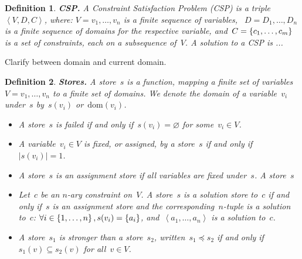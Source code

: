 \documentclass[a4paper,11pt]{article}
\newtheorem{definition}{Definition}
\newcommand{\Todo}[1]{{\color{blue}#1}}
\newcommand{\Dom}[1]{\text{dom}({#1})}
\numberwithin{equation}{section}
\begin{document}
\begin{definition}
  \textbf{CSP.} A Constraint Satisfaction Problem (CSP) is a 
  triple~$\left<V,D,C\right>$, where:
  $V = v_1, \ldots, v_n$ is a finite sequence of variables,
  ~$D = D_1, \ldots, D_n$ is a finite sequence of domains for the respective variable,
  and~$C = \left\{c_1, \ldots, c_m\right\}$ is a set of constraints, each on a subsequence of~$V$.
  A \emph{solution} to a CSP is ...
\end{definition}


\Todo{Clarify between domain and current domain.}

\begin{definition}
  \textbf{Stores.} A \emph{store}~$s$ is a function, mapping a finite set of
  variables~$V = v_1, \ldots, v_n$ to a finite set of domains. We denote the domain of
  a variable~$v_i$ under~$s$ by~$s(v_i)$ or~$\Dom{v_i}$.
  \begin{itemize}
    \item A store~$s$ is \emph{failed} if and only if~$s(v_i) = \varnothing$ for some~$v_i \in V$.
    \item   A variable~$v_i \in V$ is \emph{fixed}, or \emph{assigned},
      by a store~$s$ if and only if~$|s(v_i)| = 1$. 
    \item A store~$s$ is an \emph{assignment} store if all variables are 
      fixed under~$s$. A store~$s$ 

    \item Let~$c$ be an $n$-ary constraint on~$V$. A store~$s$ is 
      a \emph{solution store} 
      to~$c$ if and only if~$s$ is an assignment store and the
      corresponding~$n$-tuple is a solution to~$c$:
      $\forall i \in \left\{1,\ldots,n\right\}, s(v_i) = \left\{a_i\right\}$,
      and~$\left<a_1,\ldots,a_n\right>$ is a solution to~$c$.
    \item A store~$s_1$ is \emph{stronger} than a store~$s_2$, 
      written~$s_1 \preceq s_2$ if and only if~$s_1(v) \subseteq s_2(v)$ 
      for all~$v \in V$.
  \end{itemize}

\end{definition}
\end{document}
